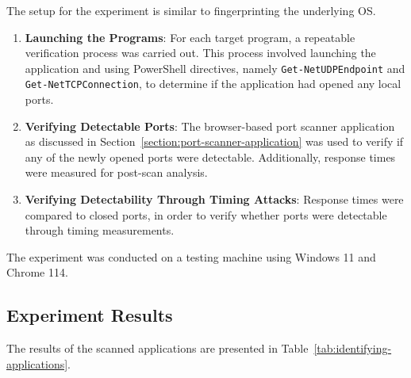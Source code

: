 The setup for the experiment is similar to fingerprinting the underlying OS.

\begin{enumerate}
    \item \textbf{Launching the Programs}: For each target program, a repeatable verification process was carried out. This process involved launching the application and using PowerShell directives, namely \texttt{Get-NetUDPEndpoint} and \texttt{Get-NetTCPConnection}, to determine if the application had opened any local ports.
    
    \item \textbf{Verifying Detectable Ports}: The browser-based port scanner application as discussed in Section~\ref{section:port-scanner-application} was used to verify if any of the newly opened ports were detectable. Additionally, response times were measured for post-scan analysis.   

    \item \textbf{Verifying Detectability Through Timing Attacks}: Response times were compared to closed ports, in order to verify whether ports were detectable through timing measurements.
\end{enumerate}

The experiment was conducted on a testing machine using Windows 11 and Chrome 114. 

\subsection{Experiment Results}

The results of the scanned applications are presented in Table~\ref{tab:identifying-applications}.

